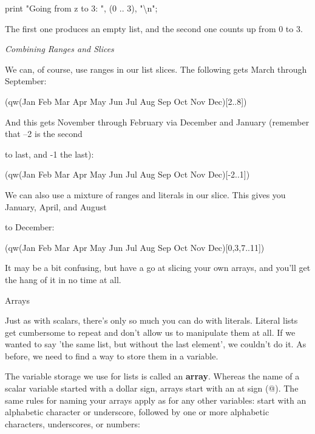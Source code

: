 \documentclass[a4paper,11pt]{book}
\begin{document}
\noindent print "Going from z to 3: ", (0 .. 3), "\textbackslash n";

\noindent 

\noindent The first one produces an empty list, and the second one counts up from 0 to 3.

\noindent 

\noindent \textit{Combining Ranges and Slices}

\noindent We can, of course, use ranges in our list slices. The following gets March through September:

\noindent 

\noindent (qw(Jan Feb Mar Apr May Jun Jul Aug Sep Oct Nov Dec)[2..8])

\noindent 

\noindent And this gets November through February via December and January (remember that --2 is the second

\noindent to last, and -1 the last):

\noindent 

\noindent (qw(Jan Feb Mar Apr May Jun Jul Aug Sep Oct Nov Dec)[-2..1])

\noindent 

\noindent We can also use a mixture of ranges and literals in our slice. This gives you January, April, and August

\noindent to December:

\noindent 

\noindent (qw(Jan Feb Mar Apr May Jun Jul Aug Sep Oct Nov Dec)[0,3,7..11])

\noindent 

\noindent It may be a bit confusing, but have a go at slicing your own arrays, and you'll get the hang of it in no time at all.

\noindent 

\noindent 

\noindent Arrays

\noindent 

\noindent Just as with scalars, there's only so much you can do with literals. Literal lists get cumbersome to repeat and don't allow us to manipulate them at all. If we wanted to say 'the same list, but without the last element', we couldn't do it. As before, we need to find a way to store them in a variable.

\noindent 

\noindent The variable storage we use for lists is called an \textbf{array}. Whereas the name of a scalar variable started with a dollar sign, arrays start with an at sign (@). The same rules for naming your arrays apply as for any other variables: start with an alphabetic character or underscore, followed by one or more alphabetic characters, underscores, or numbers:
\end{document}
